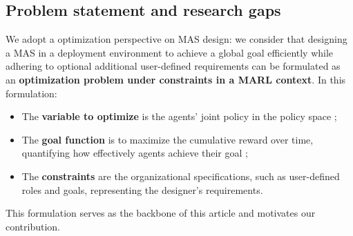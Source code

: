 \documentclass[journal]{IEEEtai}
\begin{document}

\subsection{Problem statement and research gaps}

We adopt a optimization perspective on MAS design: we consider that designing a MAS in a deployment environment to achieve a global goal efficiently while adhering to optional additional user-defined requirements can be formulated as an \textbf{optimization problem under constraints in a MARL context}. In this formulation:
\begin{itemize}
    \item The \textbf{variable to optimize} is the agents' joint policy in the policy space ;
    \item The \textbf{goal function} is to maximize the cumulative reward over time, quantifying how effectively agents achieve their goal ;
    \item The \textbf{constraints} are the organizational specifications, such as user-defined roles and goals, representing the designer's requirements.
\end{itemize}
This formulation serves as the backbone of this article and motivates our contribution. 
\end{document}

